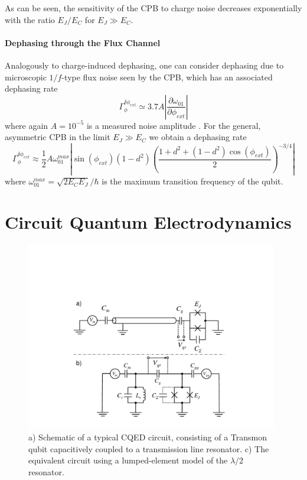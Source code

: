 As can be seen, the sensitivity of the CPB to charge noise decreases exponentially with the ratio $E_J/E_C$ for $E_J \gg E_C$.

\paragraph{Dephasing through the Flux Channel}

Analogously to charge-induced dephasing, one can consider dephasing due to microscopic $1/f$-type flux noise seen by the CPB, which has an associated dephasing rate
%
\begin{equation}
\Gamma_\phi^{\delta \phi_{ext}} \simeq 3.7A\left|\frac{\partial \omega_{01}}{\partial \phi_{ext}}\right| \label{eq:flux_dephasing_rate}
\end{equation}
%
where again $A=10^{-5}$ is a measured noise amplitude \citep{koch_charge-insensitive_2007}. For the general, asymmetric CPB in the limit $E_J \gg E_C$ we obtain a dephasing rate
%
\begin{equation}
\Gamma_\phi^{\delta \phi_{ext}} \approx \frac{1}{2} A \omega_{01}^{max}\left|\sin{(\phi_{ext})}(1-d^2)\left(\frac{1+d^2+(1-d^2)\cos{(\phi_{ext})}}{2}\right)^{-3/4}\right|
\end{equation}
%
where $\omega_{01}^{max}= \sqrt{2 E_C E_J}/\hbar$ is the maximum transition frequency of the qubit.

\section{Circuit Quantum Electrodynamics}

\begin{figure}
	\includegraphics[width=11cm]{"./material/figures/introduction/cqed/cqed"}
	\caption{a) Schematic of a typical CQED circuit, consisting of a Transmon qubit capacitively coupled to a transmission line resonator. c) The equivalent circuit using a lumped-element model of the $\lambda/2$ resonator.}
	\label{fig:CQED}
\end{figure}

